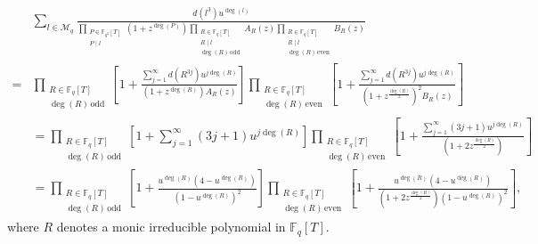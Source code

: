 \documentclass[table]{amsart}
\numberwithin{equation}{section}
\begin{document}
\begin{equation}\label{main eq 2}
\begin{split}
& \sum_{l \in \mathcal{M}_q}  \frac{ d(l^3) u^{\deg(l)} }{ \displaystyle \prod_{\substack{P \in \mathbb{F}_{q^2}[T] \\ P\mid l}} (1+z^{\deg(P)}) \displaystyle \prod_{\substack{R \in \mathbb{F}_q[T] \\ R\mid l \\ \deg(R)  \,\mathrm{ odd}}} A_R(z)  \prod_{\substack{R \in \mathbb{F}_q[T] \\ R\mid l \\ \deg(R)  \,\mathrm{ even}}} B_R(z) } \\
=&\prod_{\substack{R \in \mathbb{F}_q[T] \\ \deg(R)  \,\mathrm{ odd}}} \left[ 1+ \frac{\sum_{j=1}^\infty d(R^{3j})u^{j\deg(R)}}{(1+z^{\deg(R)}) A_R(z) }\right] \prod_{\substack{R \in \mathbb{F}_q[T] \\ \deg(R)  \,\mathrm{ even}}} \left[1+ \frac{\sum_{j=1}^\infty d(R^{3j})u^{j\deg(R)}}{(1+z^{\frac{\deg(R)}{2}})^2 B_R(z)} \right]\\
&=\prod_{\substack{R \in \mathbb{F}_q[T] \\ \deg(R)  \,\mathrm{ odd}}} \left[ 1+ {\sum_{j=1}^\infty (3j+1)u^{j\deg(R)}}\right] \prod_{\substack{R \in \mathbb{F}_q[T] \\ \deg(R)  \,\mathrm{ even}}} \left[1+ \frac{\sum_{j=1}^\infty (3j+1)u^{j\deg(R)}}{(1+2z^{\frac{\deg(R)}{2}})} \right]\\
&= \prod_{\substack{R \in \mathbb{F}_q[T] \\ \deg(R)  \,\mathrm{ odd}}} \left[ 1+ \frac{ u^{\deg(R)}(4-u^{\deg(R)})}{ (1-u^{\deg(R)})^2}\right] \prod_{\substack{R \in \mathbb{F}_q[T] \\ \deg(R)  \,\mathrm{ even}}} \left[1+ \frac{u^{\deg(R)} (4-u^{\deg(R)})}{(1+2z^{\frac{\deg(R)}{2}})(1-u^{\deg(R)})^2} \right],
\end{split}
\end{equation}
where $R$ denotes a monic irreducible polynomial in $\mathbb{F}_q[T]$. 
\end{document}
